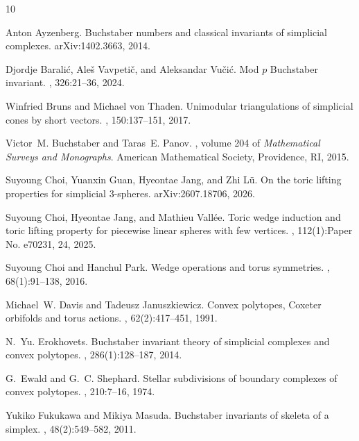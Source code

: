 \documentclass[10pt,a4paper]{amsart}
\theoremstyle{plain}
\numberwithin{equation}{section}
\theoremstyle{remark}
\theoremstyle{definition}
\begin{document}
\begin{thebibliography}{10}

Anton Ayzenberg.
\newblock Buchstaber numbers and classical invariants of simplicial complexes.
\newblock arXiv:1402.3663, 2014.

Djordje Barali\'c, Ale\v{s} Vavpeti\v{c}, and Aleksandar Vu\v{c}i\'c.
\newblock Mod {$p$} Buchstaber invariant.
, 326:21--36, 2024.

Winfried Bruns and Michael von Thaden.
\newblock Unimodular triangulations of simplicial cones by short vectors.
, 150:137--151, 2017.

Victor~M. Buchstaber and Taras~E. Panov.
, volume 204 of {\em Mathematical Surveys and Monographs}.
\newblock American Mathematical Society, Providence, RI, 2015.

Suyoung Choi, Yuanxin Guan, Hyeontae Jang, and Zhi L{\"u}.
\newblock On the toric lifting properties for simplicial {$3$}-spheres.
\newblock arXiv:2607.18706, 2026.

Suyoung Choi, Hyeontae Jang, and Mathieu Vall\'ee.
\newblock Toric wedge induction and toric lifting property for piecewise linear spheres with few vertices.
, 112(1):Paper No. e70231, 24, 2025.

Suyoung Choi and Hanchul Park.
\newblock Wedge operations and torus symmetries.
, 68(1):91--138, 2016.

Michael~W. Davis and Tadeusz Januszkiewicz.
\newblock Convex polytopes, {C}oxeter orbifolds and torus actions.
, 62(2):417--451, 1991.

N.~Yu. Erokhovets.
\newblock Buchstaber invariant theory of simplicial complexes and convex polytopes.
, 286(1):128--187, 2014.

G.~Ewald and G.~C. Shephard.
\newblock Stellar subdivisions of boundary complexes of convex polytopes.
, 210:7--16, 1974.

Yukiko Fukukawa and Mikiya Masuda.
\newblock Buchstaber invariants of skeleta of a simplex.
, 48(2):549--582, 2011.


\end{thebibliography}
\end{document}
